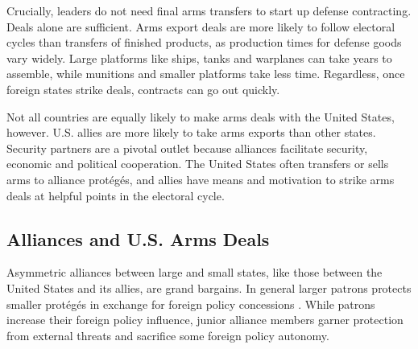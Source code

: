 \documentclass[12pt]{article}
\begin{document}
Crucially, leaders do not need final arms transfers to start up defense contracting. 
Deals alone are sufficient. 
Arms export deals are more likely to follow electoral cycles than transfers of finished products, as production times for defense goods vary widely. 
Large platforms like ships, tanks and warplanes can take years to assemble, while munitions and smaller platforms take less time. 
Regardless, once foreign states strike deals, contracts can go out quickly.


Not all countries are equally likely to make arms deals with the United States, however. 
U.S. allies are more likely to take arms exports than other states. 
Security partners are a pivotal outlet because alliances facilitate security, economic and political cooperation.
The United States often transfers or sells arms to alliance prot{\'e}g{\'e}s, and allies have means and motivation to strike arms deals at helpful points in the electoral cycle. 



\subsection{Alliances and U.S. Arms Deals}


Asymmetric alliances between large and small states, like those between the United States and its allies, are grand bargains.
In general larger patrons protects smaller prot{\'e}g{\'e}s in exchange for foreign policy concessions \citep{Morrow1991}.
While patrons increase their foreign policy influence, junior alliance members garner protection from external threats and sacrifice some foreign policy autonomy.


\end{document}
